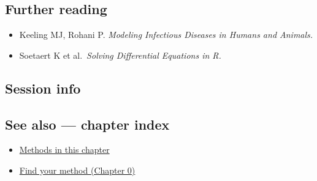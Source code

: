 \documentclass[
]{article}
\newenvironment{Shaded}{\begin{snugshade}}{\end{snugshade}}
\providecommand{\tightlist}{%
  \setlength{\itemsep}{0pt}\setlength{\parskip}{0pt}}
\begin{document}
\subsection{Further reading}\label{further-reading}

\begin{itemize}
\tightlist
\item
  Keeling MJ, Rohani P. \emph{Modeling Infectious Diseases in Humans and
  Animals.}
\item
  Soetaert K et al.~\emph{Solving Differential Equations in R.}
\end{itemize}

\subsection{Session info}\label{session-info}

\begin{Shaded}
\begin{Highlighting}[]

\end{Highlighting}
\end{Shaded}

\subsection{See also --- chapter index}\label{see-also-chapter-index}

\begin{itemize}
\tightlist
\item
  \href{../index.Rmd}{Methods in this chapter}
\item
  \href{../../../ch00-find-your-method.Rmd}{Find your method (Chapter
  0)}
\end{itemize}
\end{document}
